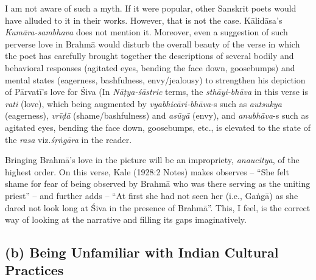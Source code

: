 I am not aware of such a myth. If it were popular, other Sanskrit poets would have alluded to it in their works. However, that is not the case. Kālidāsa’s \textsl{Kumāra-sambhava} does not mention it. Moreover, even a suggestion of such perverse love in Brahmā would disturb the overall beauty of the verse in which the poet has carefully brought together the descriptions of several bodily and behavioral responses (agitated eyes, bending the face down, goosebumps) and mental states (eagerness, bashfulness, envy/jealousy) to strengthen his depiction of Pārvatī’s love for Śiva (In \textsl{Nāṭya-śāstric} terms, the \textsl{sthāyi-bhāva} in this verse is \textsl{rati} (love), which being augmented by \hbox{\textsl{vyabhicāri-bhāva}-s} such as \textsl{autsukya} (eagerness), \textsl{vrīḍā} (shame/bashfulness) and \textsl{asūyā} (envy), and \textsl{anubhāva}-s such as agitated eyes, bending the face down, goosebumps, etc., is elevated to the state of the \textsl{rasa} viz.\@ \textsl{śṛṅgāra} in the reader. 

Bringing Brahmā’s love in the picture will be an impropriety, \textsl{anaucitya}, of the highest order. On this verse, Kale (1928:2 Notes) makes observes -- “She felt shame for fear of being observed by Brahmā who was there serving as the uniting priest” -- and further adds -- “At first she had not seen her (i.e., Gaṅgā) as she dared not look long at Śiva
 in the presence of Brahmā”. This, I feel, is the correct way of looking at the narrative and filling its gaps imaginatively.

\subsection*{(b) Being Unfamiliar with Indian Cultural Practices}

